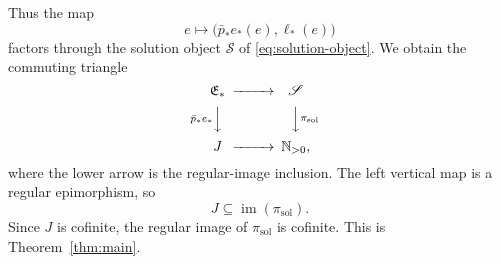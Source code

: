 Thus the map
\[
e\longmapsto\bigl(\bar p_*e_*(e),\ell_*(e)\bigr)
\]
factors through the solution object $\mathscr S$ of \eqref{eq:solution-object}.  We obtain the commuting triangle
\begin{equation}\label{eq:solution-factorization}
\begin{CD}
\mathfrak E_* @>>> \mathscr S\\
@V{\bar p_*e_*}VV @VV{\pi_{\mathrm{sol}}}V\\
J @>>> \N_{>0},
\end{CD}
\end{equation}
where the lower arrow is the regular-image inclusion.  The left vertical map is a regular epimorphism, so
\[
J\subseteq\operatorname{im}(\pi_{\mathrm{sol}}).
\]
Since $J$ is cofinite, the regular image of $\pi_{\mathrm{sol}}$ is cofinite.  This is Theorem~\ref{thm:main}.
